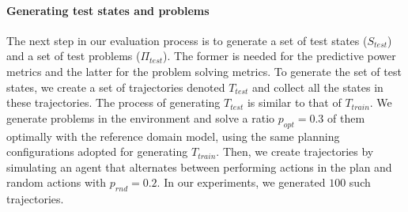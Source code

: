 \documentclass[letterpaper]{article} %
\newcommand{\T}{T}
\newcommand{\Ttrain}{\T_{train}}
\newcommand{\Ttest}{\T_{test}}
\newcommand{\stest}{\ensuremath{S_{\textit{test}}}\xspace}
\newcommand{\ptest}{\ensuremath{\Pi_{\textit{test}}}\xspace}
\newif\ifaddcomments
\newcommand{\roni}[1]{\ifaddcomments{\textcolor{red}{[Roni: #1]}}\fi}
\newcommand{\leo}[1]{\ifaddcomments{\textcolor{pink}{[Leonardo: #1]}}\fi}
\begin{document}
%



\paragraph{Generating test states and problems}
The next step in our evaluation process is to generate a set of test states ($\stest$) and a set of test problems ($\ptest$). The former is needed for the predictive power metrics and the latter for the problem solving metrics. 
To generate the set of test states, we create a set of trajectories denoted $\Ttest$ and collect all the states in these trajectories. 
The process of generating $\Ttest$ is similar to that of $\Ttrain$. 
We generate problems in the environment and solve a ratio $p_{opt}=0.3$ of them optimally with the reference domain model, using the same planning configurations adopted for generating $\Ttrain$. 
Then, we create trajectories by simulating an agent that alternates between performing actions in the plan and random actions with $p_{rnd}=0.2$. 
In our experiments, we generated $100$ such trajectories. 






\end{document}
